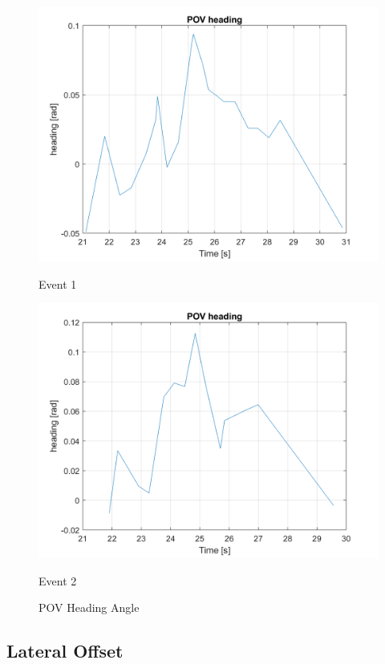 \begin{figure}[H]
\centering
\begin{minipage}[b]{0.49\textwidth}
    \includegraphics[width=\textwidth]{FiguresMat/pov_heading_10794257.png}
    \caption*{Event 1}
\end{minipage}
\begin{minipage}[b]{0.5\textwidth}
    \includegraphics[width=\textwidth]{FiguresMat/pov_heading_116147345.png}
    \caption*{Event 2}
\end{minipage}
\caption{POV Heading Angle}
\label{fig:heading_angle}
\end{figure}

\subsection{Lateral Offset}

